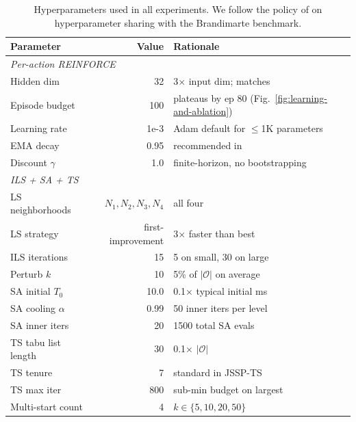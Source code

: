 \documentclass[10pt]{article}
\theoremstyle{definition}
\begin{document}
\begin{table}[h]
\centering
\caption{Hyperparameters used in all experiments. We
follow the policy of \citet{Song2022TII} on
hyperparameter sharing with the Brandimarte benchmark.}
\label{tab:hyperparams}
\small
\begin{tabular}{lrl}
\toprule
\textbf{Parameter} & \textbf{Value} & \textbf{Rationale} \\
\midrule
\multicolumn{3}{l}{\emph{Per-action REINFORCE}} \\
Hidden dim            & 32   & 3$\times$ input dim; matches \citet{Williams1992} \\
Episode budget        & 100  & plateaus by ep 80 (Fig.~\ref{fig:learning-and-ablation}) \\
Learning rate         & 1e-3 & Adam default for $\leq$1K parameters \\
EMA decay             & 0.95 & recommended in \citet{Williams1992} \\
Discount $\gamma$     & 1.0  & finite-horizon, no bootstrapping \\
\midrule
\multicolumn{3}{l}{\emph{ILS + SA + TS}} \\
LS neighborhoods      & $N_1, N_2, N_3, N_4$ & all four \\
LS strategy           & first-improvement & 3$\times$ faster than best \\
ILS iterations        & 15   & 5 on small, 30 on large \\
Perturb $k$           & 10   & 5\% of $|\mathcal{O}|$ on average \\
SA initial $T_0$      & 10.0 & 0.1$\times$ typical initial ms \\
SA cooling $\alpha$   & 0.99 & 50 inner iters per level \\
SA inner iters        & 20   & 1500 total SA evals \\
TS tabu list length   & 30   & 0.1$\times$ $|\mathcal{O}|$ \\
TS tenure             & 7    & standard in JSSP-TS \\
TS max iter           & 800  & sub-min budget on largest \\
Multi-start count     & 4    & $k \in \{5, 10, 20, 50\}$ \\
\bottomrule
\end{tabular}
\end{table}
\end{document}
